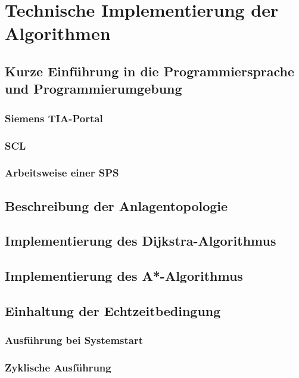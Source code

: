 \chapter{Technische Implementierung der Algorithmen}

\section{Kurze Einführung in die Programmiersprache und Programmierumgebung}

\subsection{Siemens TIA-Portal}

\subsection{SCL}

\subsection{Arbeitsweise einer SPS}

\section{Beschreibung der Anlagentopologie}

\section{Implementierung des Dijkstra-Algorithmus}

\section{Implementierung des A*-Algorithmus}

\section{Einhaltung der Echtzeitbedingung}

\cite{BorisCherkassky1993}

\subsection{Ausführung bei Systemstart}

\subsection{Zyklische Ausführung}